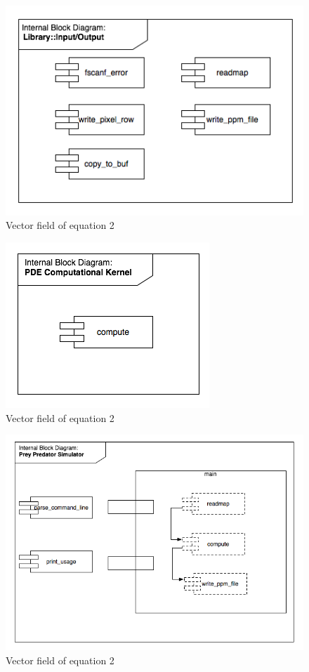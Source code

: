 \documentclass[12pt,a4paper]{article}
\begin{document}
\begin{figure}[hb]
    \centering
    \includegraphics[scale=0.6]{images/bd1.png}
    \caption{Vector field of equation 2}
\end{figure}

\begin{figure}[hb]
    \centering
    \includegraphics[scale=0.6]{images/bd2.png}
    \caption{Vector field of equation 2}
\end{figure}

\begin{figure}[hb]
    \centering
    \includegraphics[scale=0.6]{images/bd3.png}
    \caption{Vector field of equation 2}
\end{figure}
\end{document}
